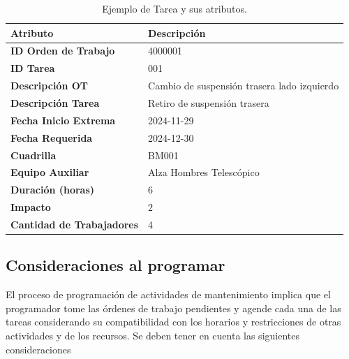 \documentclass{article}
\begin{document}
\begin{table}[htbp]
    \centering
    \captionsetup{justification=centering}
    \vspace{0.5cm}
    \begin{tabular}{p{6cm} p{8cm}}
        \toprule
        \textbf{Atributo} & \textbf{Descripción} \\
        \midrule
        \textbf{ID Orden de Trabajo} & 4000001 \\
        \textbf{ID Tarea} & 001 \\
        \textbf{Descripción OT} & Cambio de suspensión trasera lado izquierdo \\
        \textbf{Descripción Tarea} & Retiro de suspensión trasera \\
        \textbf{Fecha Inicio Extrema} & 2024-11-29 \\
        \textbf{Fecha Requerida} & 2024-12-30 \\
        \textbf{Cuadrilla} & BM001 \\
        \textbf{Equipo Auxiliar} & Alza Hombres Telescópico \\
        \textbf{Duración (horas)} & 6 \\
        \textbf{Impacto} & 2 \\
        \textbf{Cantidad de Trabajadores} & 4 \\
        \bottomrule
    \end{tabular}
    \caption{Ejemplo de Tarea y sus atributos.}
    \label{table:task}
\end{table}


\subsection{Consideraciones al programar}
El proceso de programación de actividades de mantenimiento implica que el programador tome las órdenes de trabajo pendientes y agende cada una de las tareas considerando su compatibilidad con los horarios y restricciones de otras actividades y de los recursos. Se deben tener en cuenta las siguientes consideraciones
\end{document}

